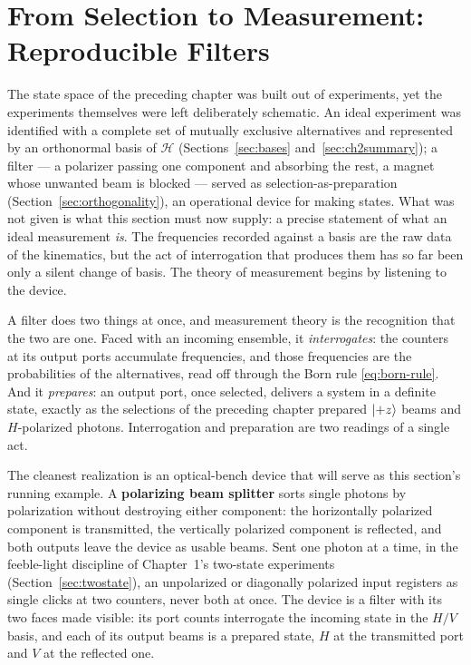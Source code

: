 \section{From Selection to Measurement: Reproducible Filters}
\label{sec:filters}

The state space of the preceding chapter was built out of experiments, yet the experiments themselves were left deliberately schematic. An ideal experiment was identified with a complete set of mutually exclusive alternatives and represented by an orthonormal basis of $\mathcal{H}$ (Sections~\ref{sec:bases} and~\ref{sec:ch2summary}); a filter --- a polarizer passing one component and absorbing the rest, a magnet whose unwanted beam is blocked --- served as selection-as-preparation (Section~\ref{sec:orthogonality}), an operational device for making states. What was not given is what this section must now supply: a precise statement of what an ideal measurement \emph{is}. The frequencies recorded against a basis are the raw data of the kinematics, but the act of interrogation that produces them has so far been only a silent change of basis. The theory of measurement begins by listening to the device.

A filter does two things at once, and measurement theory is the recognition that the two are one. Faced with an incoming ensemble, it \emph{interrogates}: the counters at its output ports accumulate frequencies, and those frequencies are the probabilities of the alternatives, read off through the Born rule \eqref{eq:born-rule}. And it \emph{prepares}: an output port, once selected, delivers a system in a definite state, exactly as the selections of the preceding chapter prepared $\ket{+z}$ beams and $H$-polarized photons. Interrogation and preparation are two readings of a single act.

The cleanest realization is an optical-bench device that will serve as this section's running example. A \textbf{polarizing beam splitter} sorts single photons by polarization without destroying either component: the horizontally polarized component is transmitted, the vertically polarized component is reflected, and both outputs leave the device as usable beams. Sent one photon at a time, in the feeble-light discipline of Chapter~1's two-state experiments (Section~\ref{sec:twostate}), an unpolarized or diagonally polarized input registers as single clicks at two counters, never both at once. The device is a filter with its two faces made visible: its port counts interrogate the incoming state in the $H/V$ basis, and each of its output beams is a prepared state, $H$ at the transmitted port and $V$ at the reflected one.

